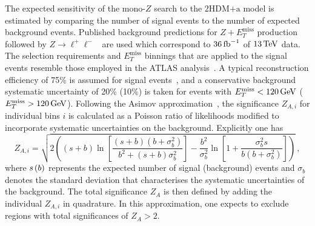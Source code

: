 \documentclass[a4paper, 11pt,notoc]{article}
\newcommand{\MET}{\ensuremath{E_T^\mathrm{miss}}\xspace}
\newcommand{\hdma}{\ensuremath{\textrm{2HDM+a}}\xspace}
\begin{document}
 The expected sensitivity of the mono-$Z$ search to the \hdma model is estimated by comparing the number of  signal events to the number of expected background events. Published background predictions for $Z+\MET$ production followed by $Z \to \ell^+ \ell^-$~\cite{Aaboud:2017bja} are used which correspond to $36 \, {\rm fb}^{-1}$ of $13 \, {\rm TeV}$ data. The selection requirements and \MET binnings that are applied to the signal events resemble those employed in the ATLAS analysis~\cite{Aaboud:2017bja}. A typical reconstruction efficiency of 75\% is assumed for signal events~\cite{Sirunyan:2017qfc},  and a conservative background systematic uncertainty of 20\% (10\%) is taken for events with $\MET < 120  \, {\rm GeV}$ ($\MET > 120  \, {\rm GeV}$). Following the Asimov approximation~\cite{Cowan:2010js}, the significance $Z_{A,i}$ for individual bins $i$ is calculated as a Poisson ratio of likelihoods modified to incorporate systematic uncertainties on the background. Explicitly one has \cite{Cowan:2012}
\begin{equation}
\label{eq:significance_wsyst}
Z_{A, i} = \sqrt{ 2 \left ( \left ( s + b \right ) \ln \left [ \frac{\left (s+b \right ) \left (b + \sigma_b^2 \right )}{b^2 + \left ( s +b \right ) \sigma_b^2 } \right ]  - \frac{b^2}{\sigma_b^2} \ln \left [ 1 + \frac{\sigma_b^2 s}{b \left ( b + \sigma_b^2 \right )} \right ] \right ) } \,, 
\end{equation}
where $s \hspace{0.5mm} \mathrm{(}b\mathrm{)}$ represents the expected number of signal (background) events and $\sigma_b$ denotes the standard deviation that characterises the systematic uncertainties of the background. The total significance $Z_A$ is then defined by adding the individual $Z_{A, i}$ in quadrature.   In this approximation, one expects to exclude regions with total significances of $Z_A > 2$. 
\end{document}
